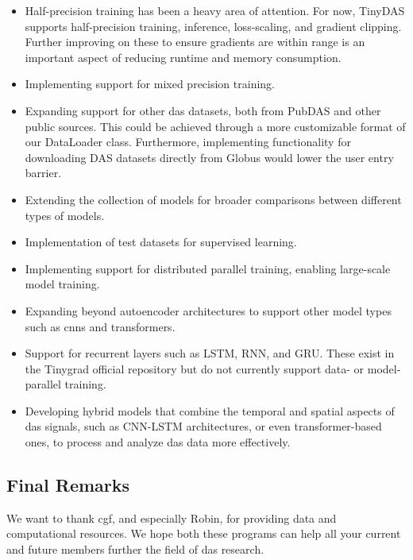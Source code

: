 \begin{itemize}
    \item  Half-precision training has been a heavy area of attention. For now, TinyDAS supports half-precision training, inference, loss-scaling, and gradient clipping. Further improving on these to ensure gradients are within range is an important aspect of reducing runtime and memory consumption. 
    \item Implementing support for mixed precision training.
    \item Expanding support for other \acrshort{das} datasets, both from PubDAS and other public sources. This could be achieved through a more customizable format of our DataLoader class. Furthermore, implementing functionality for downloading DAS datasets directly from Globus would lower the user entry barrier.
    \item Extending the collection of models for broader comparisons between different types of models.
    \item Implementation of test datasets for supervised learning.
    \item Implementing support for distributed parallel training, enabling large-scale model training. 
    \item Expanding beyond autoencoder architectures to support other model types such as \acrshort{cnn}s and transformers.
    \item Support for recurrent layers such as LSTM, RNN, and GRU. These exist in the Tinygrad official repository but do not currently support data- or model-parallel training.
    \item Developing hybrid models that combine the temporal and spatial aspects of \acrshort{das} signals, such as CNN-LSTM architectures, or even transformer-based ones, to process and analyze \acrshort{das} data more effectively.
\end{itemize}

\subsection{Final Remarks}

We want to thank \acrfull{cgf}, and especially Robin, for providing data and computational resources. We hope both these programs can help all your current and future members further the field of \acrshort{das} research.